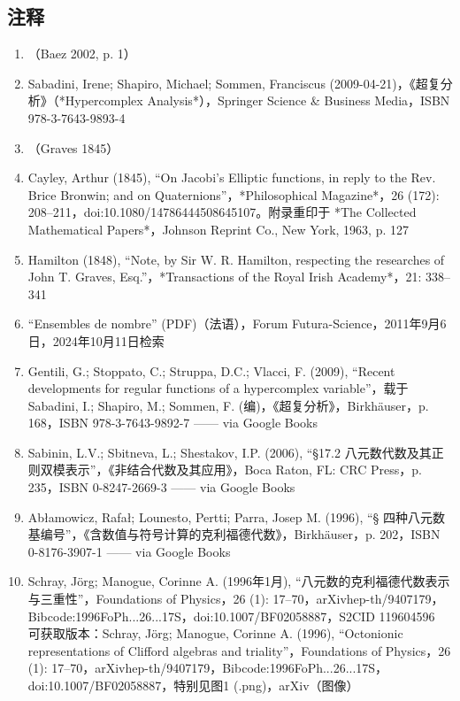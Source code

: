\subsection{注释}
\begin{enumerate}
\item （Baez 2002, p. 1）
\item Sabadini, Irene; Shapiro, Michael; Sommen, Franciscus (2009-04-21)，《超复分析》（*Hypercomplex Analysis*），Springer Science & Business Media，ISBN 978-3-7643-9893-4
\item （Graves 1845）
\item Cayley, Arthur (1845), “On Jacobi's Elliptic functions, in reply to the Rev. Brice Bronwin; and on Quaternions”，*Philosophical Magazine*，26 (172): 208–211，doi:10.1080/14786444508645107。附录重印于 *The Collected Mathematical Papers*，Johnson Reprint Co., New York, 1963, p. 127
\item Hamilton (1848), “Note, by Sir W. R. Hamilton, respecting the researches of John T. Graves, Esq.”，*Transactions of the Royal Irish Academy*，21: 338–341
\item “Ensembles de nombre” (PDF)（法语），Forum Futura-Science，2011年9月6日，2024年10月11日检索
\item Gentili, G.; Stoppato, C.; Struppa, D.C.; Vlacci, F. (2009), “Recent developments for regular functions of a hypercomplex variable”，载于 Sabadini, I.; Shapiro, M.; Sommen, F. (编)，《超复分析》，Birkhäuser，p. 168，ISBN 978-3-7643-9892-7 —— via Google Books
\item Sabinin, L.V.; Sbitneva, L.; Shestakov, I.P. (2006), “§17.2 八元数代数及其正则双模表示”，《非结合代数及其应用》，Boca Raton, FL: CRC Press，p. 235，ISBN 0-8247-2669-3 —— via Google Books
\item Abłamowicz, Rafał; Lounesto, Pertti; Parra, Josep M. (1996), “§ 四种八元数基编号”，《含数值与符号计算的克利福德代数》，Birkhäuser，p. 202，ISBN 0-8176-3907-1 —— via Google Books
\item Schray, Jörg; Manogue, Corinne A. (1996年1月), “八元数的克利福德代数表示与三重性”，Foundations of Physics，26 (1): 17–70，arXiv\:hep-th/9407179，Bibcode:1996FoPh...26...17S，doi:10.1007/BF02058887，S2CID 119604596\\
可获取版本：Schray, Jörg; Manogue, Corinne A. (1996), “Octonionic representations of Clifford algebras and triality”，Foundations of Physics，26 (1): 17–70，arXiv\:hep-th/9407179，Bibcode:1996FoPh...26...17S，doi:10.1007/BF02058887，特别见图1 (.png)，arXiv（图像）

\end{enumerate}